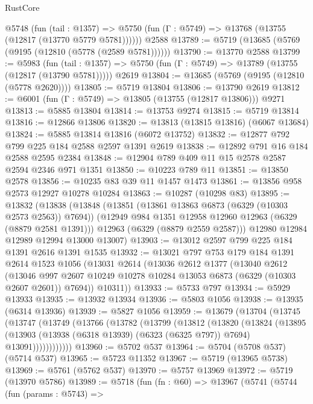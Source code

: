 \begin{lexlean}{RustCore}
\begin{coremodule}
    @5748
      (fun (tail : @1357) =>
      @5750 (fun (Γ : @5749) => @13768 (@13755 (@12817 (@13770 @5779 @5781))))))
    @2588
@13789 := @5719 (@13685 (@5769 (@9195 (@12810 (@5778 (@2589 @5781))))))
@13790 := @13770 @2588
@13799 := @5983
    (fun (tail : @1357) => @5750 (fun (Γ : @5749) => @13789 (@13755 (@12817 (@13790 @5781)))))
    @2619
@13804 := @13685 (@5769 (@9195 (@12810 (@5778 @2620))))
@13805 := @5719 @13804
@13806 := @13790 @2619
@13812 := @6001 (fun (Γ : @5749) => @13805 (@13755 (@12817 @13806))) @9271
@13813 := @5885 @13804
@13814 := @13753 @9274
@13815 := @5719 @13814
@13816 := @12866 @13806
@13820 := @13813 (@13815 @13816) (@6067 @13684)
@13824 := @5885 @13814 @13816 (@6072 @13752)
@13832 := @12877 @792 @799 @225 @184 @2588 @2597 @1391 @2619
@13838 := @12892 @791 @16 @184 @2588 @2595 @2384
@13848 := @12904 @789 @409 @11 @15 @2578 @2587 @2594 @2346 @971 @1351
@13850 := @10223 @789 @11
@13851 := @13850 @2578
@13856 := @10235 @83 @39 @11 @1457 @1473
@13861 := @13856 @958 @2573 @12927 @10278 @10284
@13863 := @10287 (@10298 @83)
@13895 := @13832
    (@13838
      (@13848
        (@13851 (@13861 @13863 @6873 (@6329 (@10303 @2573 @2563)) @7694))
        (@12949 @984 @1351 @12958 @12960 @12963 (@6329 (@8879 @2581 @1391)))
        @12963
        (@6329 (@8879 @2559 @2587)))
      @12980
      @12984
      @12989
      @12994
      @13000
      @13007)
@13903 := @13012 @2597 @799 @225 @184 @1391 @2616 @1391 @1535
@13932 := @13021
    @797
    @753
    @179
    @184
    @1391
    @2614
    @1523
    @1056
    (@13031
      @2614
      (@13036
        @2612
        @1377
        (@13040
          @2612
          (@13046 @997 @2607 @10249 @10278 @10284 @13053 @6873 (@6329 (@10303 @2607 @2601)) @7694))
        @10311))
@13933 := @5733 @797
@13934 := @5929 @13933
@13935 := @13932 @13934
@13936 := @5803 @1056
@13938 := @13935 (@6314 @13936)
@13939 := @5827 @1056
@13959 := @13679
    (@13704
      (@13745
        (@13747
          (@13749
            (@13766
              (@13782
                (@13799
                  (@13812
                    (@13820
                      (@13824
                        (@13895
                          (@13903
                            (@13938 (@6318 @13939) (@6323 (@6325 @797)) @7694)
                            @13091))))))))))))
@13960 := @5702 @537
@13964 := @5704 (@5708 @537) (@5714 @537)
@13965 := @5723 @11352
@13967 := @5719 (@13965 @5738)
@13969 := @5761 (@5762 @537)
@13970 := @5757 @13969
@13972 := @5719 (@13970 @5786)
@13989 := @5718
    (fun (fn : @60) =>
    @13967
      (@5741
        (@5744
          (fun (params : @5743) =>

\end{coremodule}
\end{lexlean}
